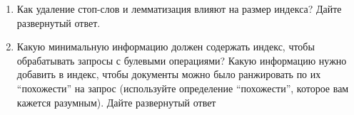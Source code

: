 \begin{enumerate}
	\item  Как удаление стоп-слов и лемматизация влияют на размер индекса? Дайте	
	развернутый ответ.
	
	\item Какую минимальную информацию должен содержать индекс, чтобы обрабатывать запросы с 
	булевыми операциями? Какую информацию нужно добавить в индекс, чтобы документы можно было 
	ранжировать по их “похожести” на запрос (используйте определение “похожести”, которое вам 
	кажется разумным). Дайте развернутый ответ
\end{enumerate}
